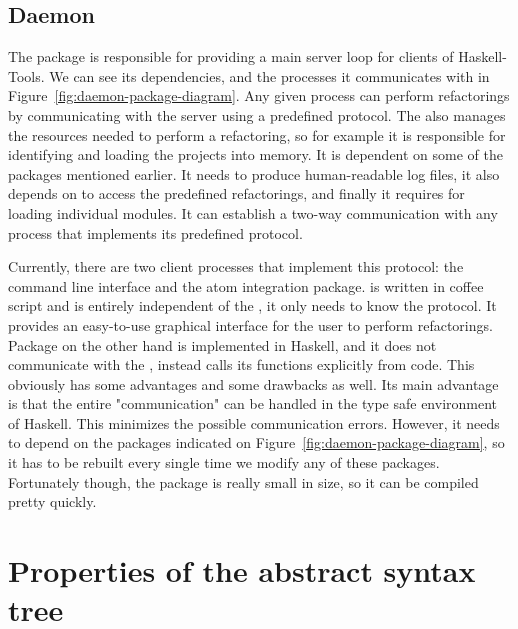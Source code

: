 \documentclass[main.tex]{subfiles}
\begin{document}
	
	
	\subsection{Daemon} 
	
	The  package is responsible for providing a main server loop for clients of Haskell-Tools. We can see its dependencies, and the processes it communicates with in Figure~\ref{fig:daemon-package-diagram}. Any given process can perform refactorings by communicating with the server using a predefined protocol. The  also manages the resources needed to perform a refactoring, so for example it is responsible for identifying and loading the projects into memory. It is dependent on some of the packages mentioned earlier. It needs  to produce human-readable log files, it also depends on  to access the predefined refactorings, and finally it requires  for loading individual modules. It can establish a two-way communication with any process that implements its predefined protocol.
	
	
	
	Currently, there are two client processes that implement this protocol: the command line interface and the atom integration package.  is written in coffee script and is entirely independent of the , it only needs to know the protocol. It provides an easy-to-use graphical interface for the user to perform refactorings. Package  on the other hand is implemented in Haskell, and it does not communicate with the , instead calls its functions explicitly from code. This obviously has some advantages and some drawbacks as well. Its main advantage is that the entire "communication" can be handled in the type safe environment of Haskell. This minimizes the possible communication errors. However, it needs to depend on the packages indicated on Figure~\ref{fig:daemon-package-diagram}, so it has to be rebuilt every single time we modify any of these packages. Fortunately though, the  package is really small in size, so it can be compiled pretty quickly.
		
	\section{Properties of the abstract syntax tree}
	
\end{document}
